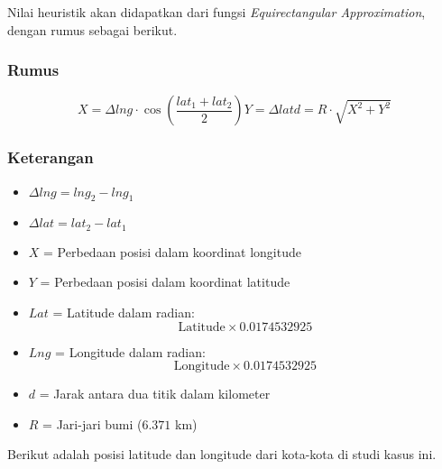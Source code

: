 \documentclass[12pt,a4paper]{article}
\begin{document}
Nilai heuristik akan didapatkan dari fungsi \emph{Equirectangular Approximation},
dengan rumus sebagai berikut.

\subsubsection*{Rumus}

\begin{center}
\[ 
  X = \Delta lng \cdot \cos \left( \frac{lat_1 + lat_2}{2} \right) 

  Y = \Delta lat 

  d = R \cdot \sqrt{X^2 + Y^2} 

\]
\end{center}

\subsubsection*{Keterangan}

\begin{itemize}
    \item \(\Delta lng = lng_2 - lng_1\)
    \item \(\Delta lat = lat_2 - lat_1\)
    \item \(X\) = Perbedaan posisi dalam koordinat longitude
    \item \(Y\) = Perbedaan posisi dalam koordinat latitude
    \item \(Lat\) = Latitude dalam radian:
    \[
    \text{Latitude} \times 0.0174532925
    \]
    \item \(Lng\) = Longitude dalam radian:
    \[
    \text{Longitude} \times 0.0174532925
    \]
    \item \(d\) = Jarak antara dua titik dalam kilometer
    \item \(R\) = Jari-jari bumi (\(6.371\) km)
\end{itemize}

Berikut adalah posisi latitude dan longitude dari kota-kota di studi kasus ini.
\end{document}
